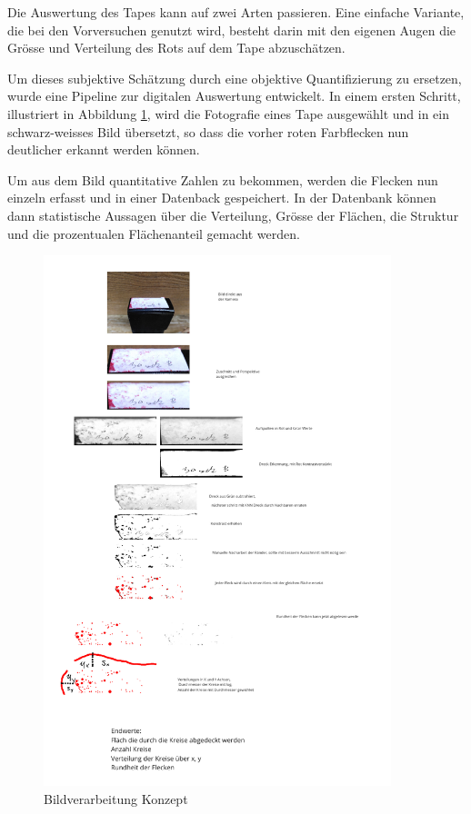 Die Auswertung des Tapes kann auf zwei Arten passieren. Eine einfache Variante, die bei den Vorversuchen genutzt wird, besteht darin mit den eigenen Augen die Grösse und Verteilung des Rots auf dem Tape abzuschätzen.



Um dieses subjektive Schätzung durch eine objektive Quantifizierung zu ersetzen, wurde eine Pipeline zur digitalen Auswertung entwickelt. In einem ersten Schritt, illustriert in Abbildung \ref{fig:Bildverarbeitnugskonzpet}, wird die Fotografie eines Tape ausgewählt und in ein schwarz-weisses Bild übersetzt, so dass die vorher roten Farbflecken nun deutlicher erkannt werden können.

Um aus dem Bild quantitative Zahlen zu bekommen, werden die Flecken nun einzeln erfasst und in einer Datenback gespeichert. In der Datenbank können dann statistische Aussagen über die Verteilung, Grösse der Flächen, die Struktur und die prozentualen Flächenanteil gemacht werden.



\begin{figure}
    \centering
    \includegraphics[width=0.9\textwidth]{Bilder/Screenshotfrom2024-04-0112-59-42.png}
    \caption{Bildverarbeitung Konzept}
    \label{fig:Bildverarbeitnugskonzpet}
\end{figure}

\newpage
